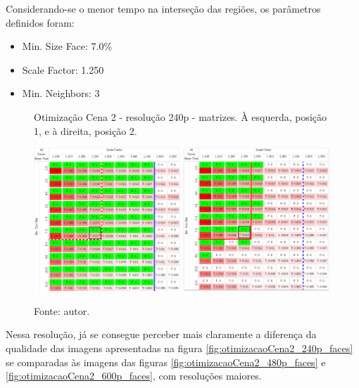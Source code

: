 Considerando-se o menor tempo na interseção das regiões, os parâmetros definidos foram: 
\begin{itemize}
    \SingleSpacing
    \item Min. Size Face: 7.0\%
    \item Scale Factor: 1.250
    \item Min. Neighbors: 3
\end{itemize}

\begin{figure}[H]
    \centering
    \caption[Otimização Cena 2 - resolução 240p - matrizes. À esquerda posição 1 e à direita, posição 2]{Otimização Cena 2 - resolução 240p - matrizes. À esquerda, posição 1, e à direita, posição 2.}
    \includegraphics[width=0.49\textwidth]{Cap4_Experimentos_Realizados/Figures/cena2_320x240_pos1_matriz.jpg}
    \includegraphics[width=0.49\textwidth]{Cap4_Experimentos_Realizados/Figures/cena2_320x240_pos2_matriz.jpg}
    \caption*{Fonte: autor.}
    \label{fig:otimizacaoCena2_240p_matrizes}
\end{figure}

Nessa resolução, já se consegue perceber mais claramente a diferença da qualidade das imagens apresentadas na figura \ref{fig:otimizacaoCena2_240p_faces} se comparadas às imagens das figuras \ref{fig:otimizacaoCena2_480p_faces} e \ref{fig:otimizacaoCena2_600p_faces}, com resoluções maiores.

